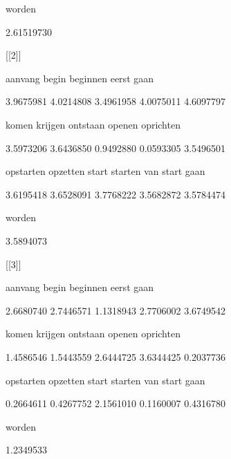        worden 



    2.61519730 



[[2]]



       aanvang          begin       beginnen          eerst           gaan 



     3.9675981      4.0214808      3.4961958      4.0075011      4.6097797 



         komen        krijgen       ontstaan         openen      oprichten 



     3.5973206      3.6436850      0.9492880      0.0593305      3.5496501 



     opstarten       opzetten          start        starten van start gaan 



     3.6195418      3.6528091      3.7768222      3.5682872      3.5784474 



        worden 



     3.5894073 



[[3]]



       aanvang          begin       beginnen          eerst           gaan 



     2.6680740      2.7446571      1.1318943      2.7706002      3.6749542 



         komen        krijgen       ontstaan         openen      oprichten 



     1.4586546      1.5443559      2.6444725      3.6344425      0.2037736 



     opstarten       opzetten          start        starten van start gaan 



     0.2664611      0.4267752      2.1561010      0.1160007      0.4316780 



        worden 



     1.2349533 



